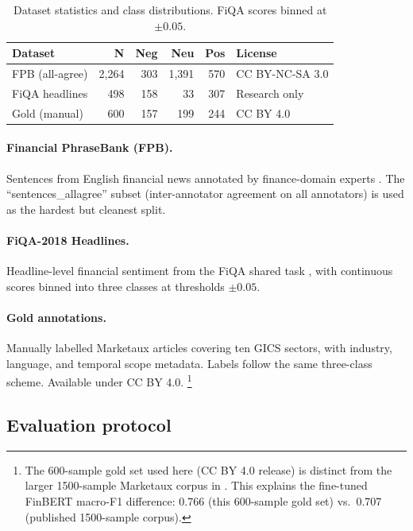 \documentclass[11pt]{article}
\begin{document}
\begin{table}[h]
\centering
\small
\begin{tabular}{lrrrrl}
\toprule
\textbf{Dataset} & \textbf{N} & \textbf{Neg} & \textbf{Neu} & \textbf{Pos} & \textbf{License} \\
\midrule
FPB (all-agree)   & 2{,}264 & 303  & 1{,}391 & 570 & CC BY-NC-SA 3.0 \\
FiQA headlines    &   498   & 158  &    33   & 307 & Research only   \\
Gold (manual)     &   600   & 157  &   199   & 244 & CC BY 4.0       \\
\bottomrule
\end{tabular}
\caption{Dataset statistics and class distributions. FiQA scores binned
  at $\pm 0.05$.}
\label{tab:data}
\end{table}

\paragraph{Financial PhraseBank (FPB).} Sentences from English financial news
annotated by finance-domain experts \cite{malo2014good}. The
``sentences\_allagree'' subset (inter-annotator agreement on all annotators)
is used as the hardest but cleanest split.

\paragraph{FiQA-2018 Headlines.} Headline-level financial sentiment from the
FiQA shared task \cite{maia2018fiqa18}, with continuous scores binned into
three classes at thresholds $\pm 0.05$.

\paragraph{Gold annotations.} Manually labelled Marketaux articles covering
ten GICS sectors, with industry, language, and temporal scope metadata.
Labels follow the same three-class scheme. Available under CC BY 4.0.
\footnote{The 600-sample gold set used here (CC BY 4.0 release) is distinct from the
larger 1500-sample Marketaux corpus in \cite{xai_finnews_2025}. This explains
the fine-tuned FinBERT macro-F1 difference: 0.766 (this 600-sample gold set)
vs.\ 0.707 (published 1500-sample corpus).}

\subsection{Evaluation protocol}
\end{document}
